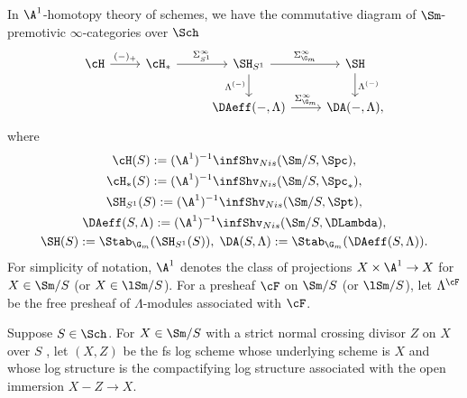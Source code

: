 \documentclass[10pt]{amsart}
\begin{document}
\begin{df}
\label{logSH.1}
In $\A^1$-homotopy theory of schemes, we have the commutative diagram of $\Sm$-premotivic $\infty$-categories over $\Sch$
\[
\begin{tikzcd}
\cH \ar[r,"(-)_+"]&
\cH_* \ar[r,"\Sigma_{S^1}^\infty"]&
\SH_{S^1}\ar[r,"\Sigma_{\G_m}^\infty"]\ar[d,"{\Lambda^{(-)}}"']&
\SH\ar[d,"{\Lambda^{(-)}}"]
\\
&
&
\DAeff(-,\Lambda)\ar[r,"\Sigma_{\G_m}^\infty"]&
\DA(-,\Lambda),
\end{tikzcd}
\]
where
\begin{gather*}
\cH(S)
:=
(\A^1)^{-1}\infShv_{Nis}(\Sm/S,\Spc),
\\
\cH_*(S)
:=
(\A^1)^{-1}\infShv_{Nis}(\Sm/S,\Spc_*),
\\
\SH_{S^1}(S)
:=
(\A^1)^{-1}\infShv_{Nis}(\Sm/S,\Spt),
\\
\DAeff(S,\Lambda)
:=
(\A^1)^{-1}\infShv_{Nis}(\Sm/S,\DLambda),
\\
\SH(S)
:=
\Stab_{\G_m}(\SH_{S^1}(S)),
\;
\DA(S,\Lambda)
:=
\Stab_{\G_m}(\DAeff(S,\Lambda)).
\end{gather*}
For simplicity of notation, $\A^1$ denotes the class of projections $X\times \A^1\to X$ for $X\in \Sm/S$ (or $X\in \lSm/S$).
For a presheaf $\cF$ on $\Sm/S$ (or $\lSm/S$), let $\Lambda^{\cF}$ be the free presheaf of $\Lambda$-modules associated with $\cF$.
\end{df}

\begin{df}
Suppose $S\in \Sch$.
For $X\in \Sm/S$ with a strict normal crossing divisor $Z$ on $X$ over $S$ \cite[Definition 7.2.1]{logDM}, let $(X,Z)$ be the fs log scheme whose underlying scheme is $X$ and whose log structure is the compactifying log structure \cite[Definition III.1.6.1]{Ogu} associated with the open immersion $X-Z\to X$.
\end{df}
\end{document}
